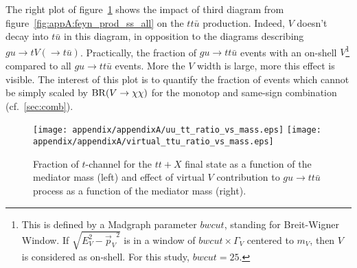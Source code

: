 The right plot of figure~\ref{fig:appA:fractionOftandvirtualV} shows the impact of third diagram from figure~\ref{fig:appA:feyn_prod_ss_all} on the $tt\bar{u}$ production. 
Indeed, $V$ doesn't decay into $t\bar{u}$ in this diagram, in opposition to the diagrams describing $gu \to tV(\to t\bar{u})$. Practically, 
the fraction of $gu \to tt\bar{u}$ events with an on-shell $V$\footnote{This is defined by a Madgraph parameter $bwcut$, 
standing for Breit-Wigner Window. If $\sqrt{E_V^2 - {\vec{p}_V}^2}$ is in a window of $bwcut \times \Gamma_V$ centered to $m_V$, then $V$ is considered as on-shell. For this study, $bwcut=25$.} compared 
to all $gu \to tt\bar{u}$ events. More the $V$ width is large, more this effect is visible. The interest of this plot is to quantify the fraction of events 
which cannot be simply scaled by $\mathrm{BR}({V} \to {\chi\chi})$ for the monotop and same-sign combination (cf.~\ref{sec:comb}).

\begin{figure}[!h!tpd]
  \centering
  \texttt{[image: appendix/appendixA/uu\_tt\_ratio\_vs\_mass.eps]}
  \texttt{[image: appendix/appendixA/virtual\_ttu\_ratio\_vs\_mass.eps]}
  \caption{
    Fraction of $t$-channel for the $tt+X$ final state as a function of the mediator mass (left) and effect of virtual $V$ contribution to 
    $gu \to tt\bar{u}$ process as a function of the mediator mass (right).
  }
  \label{fig:appA:fractionOftandvirtualV}
\end{figure}
